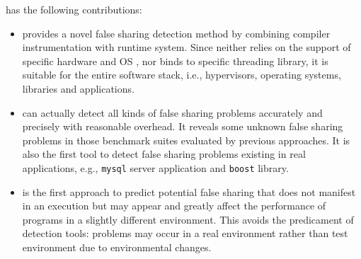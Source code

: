 \Defaults{} has the following contributions:
\begin{itemize}
\item
 provides a novel false sharing detection method by
combining compiler instrumentation with runtime system.
Since  neither relies on the support of specific hardware and OS ,
nor binds to specific threading library, 
it is suitable for the entire software stack, 
i.e., hypervisors, operating systems, libraries and applications. 

\item
{} can actually detect all kinds of false sharing problems accurately and precisely 
with reasonable overhead. 
It reveals some unknown false sharing problems in those benchmark suites evaluated by 
previous approaches.
It is also the first tool to detect false sharing problems existing in real applications, e.g.,
\texttt{mysql} server application and \texttt{boost} library.

\item
{} is the first approach to predict potential false sharing that does
not manifest in an execution but may appear and greatly affect the performance of programs 
in a slightly different environment. 
This avoids the predicament of detection tools: problems may occur in a real
environment rather than test environment due to environmental changes. 


\end{itemize}

